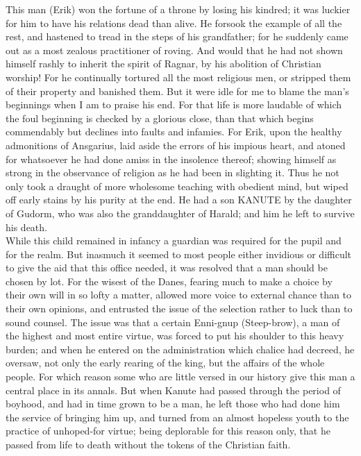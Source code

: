 \documentclass[10pt,a4paper]{report}
\begin{document}
This man (Erik) won the fortune of a throne by losing his kindred; it was luckier for him to have his relations dead than alive. He forsook the example of all the rest, and hastened to tread in the steps of his grandfather; for he suddenly came out as a most zealous practitioner of roving. And would that he had not shown himself rashly to inherit the spirit of Ragnar, by his abolition of Christian worship! For he continually tortured all the most religious men, or stripped them of their property and banished them. But it were idle for me to blame the man's beginnings when I am to praise his end. For that life is more laudable of which the foul beginning is checked by a glorious close, than that which begins commendably but declines into faults and infamies. For Erik, upon the healthy admonitions of Ansgarius, laid aside the errors of his impious heart, and atoned for whatsoever he had done amiss in the insolence thereof; showing himself as strong in the observance of religion as he had been in slighting it. Thus he not only took a draught of more wholesome teaching with obedient mind, but wiped off early stains by his purity at the end. He had a son KANUTE by the daughter of Gudorm, who was also the granddaughter of Harald; and him he left to survive his death.\\

While this child remained in infancy a guardian was required for the pupil and for the realm. But inasmuch it seemed to most people either invidious or difficult to give the aid that this office needed, it was resolved that a man should be chosen by lot. For the wisest of the Danes, fearing much to make a choice by their own will in so lofty a matter, allowed more voice to external chance than to their own opinions, and entrusted the issue of the selection rather to luck than to sound counsel. The issue was that a certain Enni-gnup (Steep-brow), a man of the highest and most entire virtue, was forced to put his shoulder to this heavy burden; and when he entered on the administration which chalice had decreed, he oversaw, not only the early rearing of the king, but the affairs of the whole people. For which reason some who are little versed in our history give this man a central place in its annals. But when Kanute had passed through the period of boyhood, and had in time grown to be a man, he left those who had done him the service of bringing him up, and turned from an almost hopeless youth to the practice of unhoped-for virtue; being deplorable for this reason only, that he passed from life to death without the tokens of the Christian faith.\\
\end{document}
